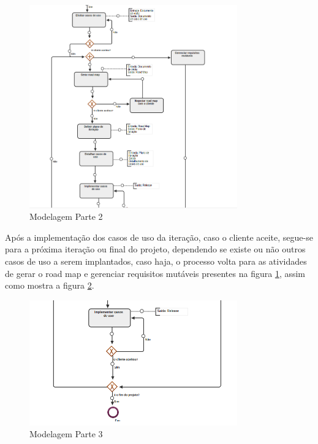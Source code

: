 \begin{figure}[H]
	\centering
	\includegraphics[width=0.8\textwidth]{imgModelagem/modelagem2}
	\caption{Modelagem Parte 2}
	\label{img:modelagem2}
\end{figure}

Após a implementação dos casos de uso da iteração, caso o cliente aceite, segue-se para a próxima iteração ou final do projeto, dependendo se existe ou não outros casos de uso a serem implantados, caso haja, o processo volta para as atividades de gerar o road map  e gerenciar requisitos mutáveis presentes na figura \ref{img:modelagem2}, assim como mostra a figura \ref{img:modelagem3}.

\begin{figure}[H]
	\centering
	\includegraphics[width=0.8\textwidth]{imgModelagem/modelagem3}
	\caption{Modelagem Parte 3}
	\label{img:modelagem3}
\end{figure}
